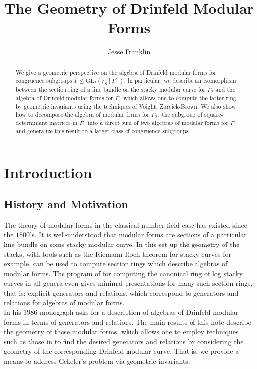 \documentclass[11pt]{amsart}
\theoremstyle{definition}
\numberwithin{equation}{section}
\newcommand{\GL}{\mathrm{GL}} 	%
\newcommand{\bbF}{\mathbb{F}}		%
\begin{document}
	
\title{The Geometry of Drinfeld Modular Forms}
\author{Jesse Franklin}
	
	\begin{abstract}
			We give a geometric perspective on the algebra of Drinfeld modular forms for congruence subgroups $\Gamma\leq \GL_2(\bbF_q[T]).$ In particular, we describe an isomorphism between the section ring of a line bundle on the stacky modular curve for $\Gamma_2$ and the algebra of Drinfeld modular forms for $\Gamma,$ which allows one to compute the latter ring by geometric invariants using the techniques of Voight, Zureick-Brown. We also show how to decompose the algebra of modular forms for $\Gamma_2,$ the subgroup of square-determinant matrices in $\Gamma,$ into a direct sum of two algebras of modular forms for $\Gamma$ and generalize this result to a larger class of congruence subgroups. 
		\end{abstract}
		\maketitle
		\tableofcontents
		
		\section{Introduction}
		
		\subsection{History and Motivation}
		The theory of modular forms in the classical number-field case has existed since the $1800$'s. It is well-understood that modular forms are sections of a particular line bundle on some stacky modular curve. In this set up the geometry of the stacks, with tools such as the Riemann-Roch theorem for stacky curves for example, can be used to compute section rings which describe algebras of modular forms. The program of \cite{VZB} for computing the canonical ring of log stacky curves in all genera even gives minimal presentations for many such section rings, that is: explicit generators and relations, which correspond to generators and relations for algebras of modular forms.\\
		
		In his $1986$ monograph \cite[Page $\mathrm{XIII}$]{Gekeler-Curves} asks for a description of algebras of Drinfeld modular forms in terms of generators and relations. The main results of this note describe the geometry of those modular forms, which allows one to employ techniques such as those in \cite{VZB} to find the desired generators and relations by considering the geometry of the corresponding Drinfeld modular curve. That is, we provide a means to address Gekeler's problem via geometric invariants.\\
		
\end{document}
